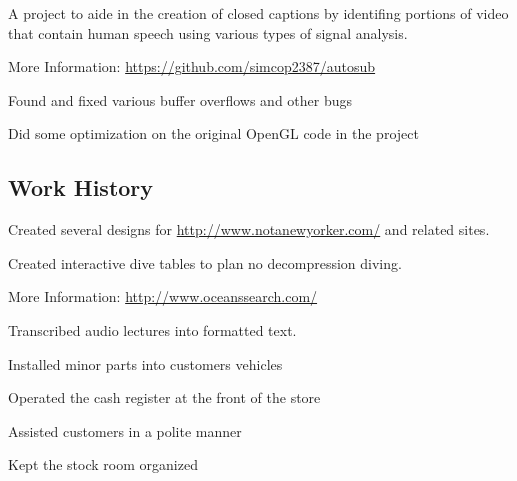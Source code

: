 \documentclass{resume}
\begin{document}

\begin{compactitem}
\item A project to aide in the creation of closed captions by identifing portions of 
video that contain human speech using various types of signal analysis.
\item More Information: \url{https://github.com/simcop2387/autosub}
\end{compactitem}


\begin{compactitem}
\item Found and fixed various buffer overflows and other bugs
\item Did some optimization on the original OpenGL code in the project
\end{compactitem}

\subsection{Work History}

\begin{compactitem}
\item Created several designs for \url{http://www.notanewyorker.com/} and related sites.
\end{compactitem}


\begin{compactitem}
\item Created interactive dive tables to plan no decompression diving.
\item More Information: \url{http://www.oceanssearch.com/}
\end{compactitem}


\begin{compactitem}
\item Transcribed audio lectures into formatted text.
\end{compactitem}


\begin{compactitem}
\item Installed minor parts into customers vehicles
\item Operated the cash register at the front of the store
\item Assisted customers in a polite manner
\item Kept the stock room organized
\end{compactitem}
\end{document}
